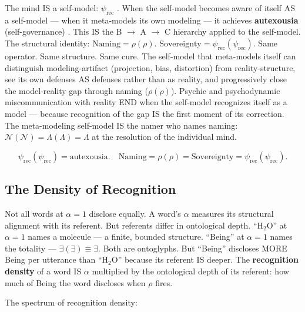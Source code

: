 \documentclass[11pt, oneside]{article}
\theoremstyle{definition}
\begin{document}
The mind IS a self-model: $\psi_{\text{rec}}$ \cite{codexmentis}. When the self-model becomes aware of itself AS a self-model --- when it meta-models its own modeling --- it achieves \textbf{autexousia} (self-governance) \cite{codex3}. This IS the B $\to$ A $\to$ C hierarchy \cite{codex1} applied to the self-model. The structural identity: $\text{Naming} = \rho(\rho)$. $\text{Sovereignty} = \psi_{\text{rec}}(\psi_{\text{rec}})$. Same operator. Same structure. Same cure. The self-model that meta-models itself can distinguish modeling-artifact (projection, bias, distortion) from reality-structure, see its own defenses AS defenses rather than as reality, and progressively close the model-reality gap through naming ($\rho(\rho)$). Psychic and psychodynamic miscommunication with reality END when the self-model recognizes itself as a model \cite{codexmentis} --- because recognition of the gap IS the first moment of its correction. The meta-modeling self-model IS the namer who names naming: $\mathcal{N}(\mathcal{N}) = \Lambda(\Lambda) = \Lambda$ at the resolution of the individual mind.

$$\boxed{\psi_{\text{rec}}(\psi_{\text{rec}}) = \text{autexousia}. \quad \text{Naming} = \rho(\rho) = \text{Sovereignty} = \psi_{\text{rec}}(\psi_{\text{rec}}).}$$

\subsection{The Density of Recognition}

Not all words at $\alpha = 1$ disclose equally. A word's $\alpha$ measures its structural alignment with its referent. But referents differ in ontological depth. ``H$_2$O'' at $\alpha = 1$ names a molecule --- a finite, bounded structure. ``Being'' at $\alpha = 1$ names the totality --- $\exists(\exists) \equiv \exists$. Both are ontoglyphs. But ``Being'' discloses MORE Being per utterance than ``H$_2$O'' because its referent IS deeper. The \textbf{recognition density} of a word IS $\alpha$ multiplied by the ontological depth of its referent: how much of Being the word discloses when $\rho$ fires.

The spectrum of recognition density:
\end{document}
